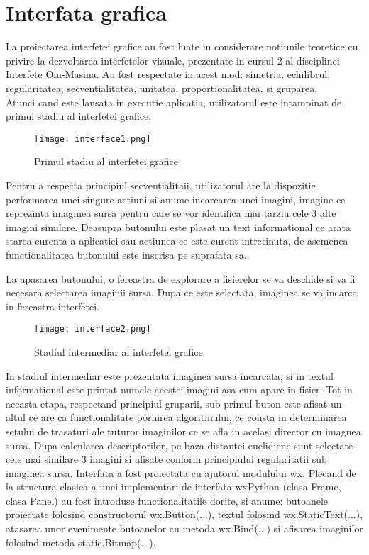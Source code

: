 \section{Interfata grafica}

\quad La proiectarea interfetei grafice au fost luate in considerare notiunile
teoretice cu privire la dezvoltarea interfetelor vizuale, prezentate in cursul
2 al disciplinei Interfete Om-Masina. Au fost respectate in acest mod: simetria,
echilibrul, regularitatea, secventialitatea, unitatea, proportionalitatea,
si gruparea. \\
Atunci cand este lansata in executie aplicatia, utilizatorul este intampinat de 
primul stadiu al interfetei grafice.

\begin{figure}[H]
	\texttt{[image: interface1.png]}
	\centering
	\caption{Primul stadiu al interfetei grafice}
\end{figure}

Pentru a respecta principiul secventialitaii, utilizatorul are la dispozitie 
performarea unei singure actiuni si anume incarcarea unei imagini, imagine ce 
reprezinta imaginea sursa pentru care se vor identifica mai tarziu cele 3 alte
imagini similare. Deasupra butonului este plasat un text informational ce arata
starea curenta a aplicatiei sau actiunea ce este curent intretinuta, de asemenea functionalitatea butonului este inscrisa pe suprafata sa.


La apasarea butonului, o fereastra de explorare a fisierelor se va deschide si va fi necesara selectarea imaginii sursa. Dupa ce este selectata, imaginea se va incarca in fereastra
interfetei.

\begin{figure}[H]
	\texttt{[image: interface2.png]}
	\centering
	\caption{Stadiul intermediar al interfetei grafice}
\end{figure}

In stadiul intermediar este prezentata imaginea sursa incarcata, si in textul 
informational este printat numele acestei imagini asa cum apare in fisier. 
Tot in aceasta etapa, respectand principiul gruparii, sub primul buton este afisat
un altul ce are ca functionalitate pornirea algoritmului, ce consta in determinarea
setului de trasaturi ale tuturor imaginilor ce se afla in acelasi director cu imagnea
sursa. Dupa calcularea descriptorilor, pe baza distantei euclidiene sunt selectate
cele mai similare 3 imagini si afisate conform principiului regularitatii sub imaginea
sursa. Interfata a fost proiectata cu ajutorul modulului wx. Plecand de la structura
clasica a unei implementari de interfata wxPython (clasa Frame, clasa Panel) au fost
introduse functionalitatile dorite, si anume: butoanele proiectate folosind constructorul
wx.Button(...), textul folosind wx.StaticText(...), atasarea unor evenimente butoanelor
cu metoda wx.Bind(...) si afisarea imaginilor folosind metoda static.Bitmap(...).


